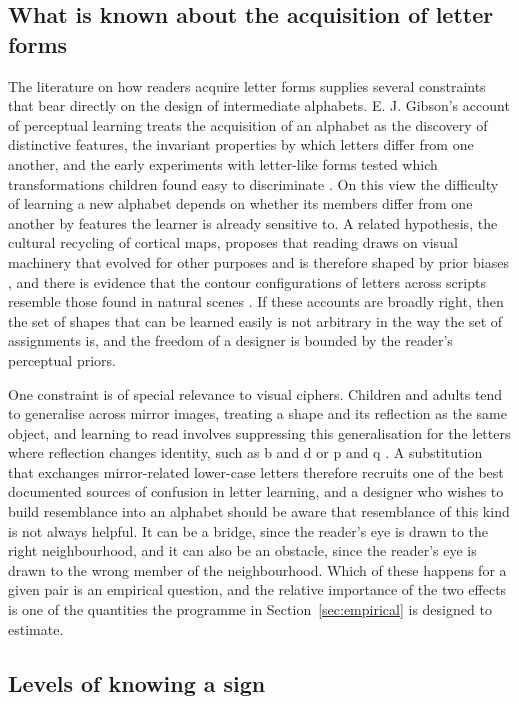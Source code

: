\subsection{What is known about the acquisition of letter forms}

The literature on how readers acquire letter forms supplies several constraints that bear directly on the design of intermediate alphabets. E. J. Gibson's account of perceptual learning treats the acquisition of an alphabet as the discovery of distinctive features, the invariant properties by which letters differ from one another, and the early experiments with letter-like forms tested which transformations children found easy to discriminate \citep{gibson1969,gibson1962}. On this view the difficulty of learning a new alphabet depends on whether its members differ from one another by features the learner is already sensitive to. A related hypothesis, the cultural recycling of cortical maps, proposes that reading draws on visual machinery that evolved for other purposes and is therefore shaped by prior biases \citep{dehaene2007,dehaene2009}, and there is evidence that the contour configurations of letters across scripts resemble those found in natural scenes \citep{changizi2006}. If these accounts are broadly right, then the set of shapes that can be learned easily is not arbitrary in the way the set of assignments is, and the freedom of a designer is bounded by the reader's perceptual priors.

One constraint is of special relevance to visual ciphers. Children and adults tend to generalise across mirror images, treating a shape and its reflection as the same object, and learning to read involves suppressing this generalisation for the letters where reflection changes identity, such as b and d or p and q \citep{dehaene2010}. A substitution that exchanges mirror-related lower-case letters therefore recruits one of the best documented sources of confusion in letter learning, and a designer who wishes to build resemblance into an alphabet should be aware that resemblance of this kind is not always helpful. It can be a bridge, since the reader's eye is drawn to the right neighbourhood, and it can also be an obstacle, since the reader's eye is drawn to the wrong member of the neighbourhood. Which of these happens for a given pair is an empirical question, and the relative importance of the two effects is one of the quantities the programme in Section~\ref{sec:empirical} is designed to estimate.

\subsection{Levels of knowing a sign}


